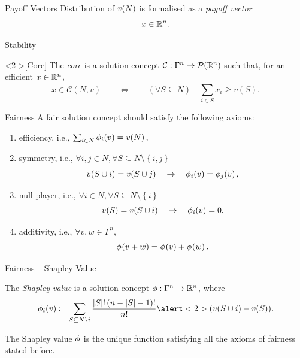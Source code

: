 \documentclass[aspectratio=169]{beamer}
\begin{document}
\begin{frame}{Payoff Vectors}
	Distribution of $ \fce{v}{N} $ is formalised as a \emph{payoff vector}
	\[
		x \in \R^n.
	\]


\end{frame}

\begin{frame}{Stability}
	\begin{definition}<2->[Core]
		The \emph{core} is a solution concept $ \mathcal{C}: \Gamma^n \to \pot {\R^n} $ such that, for an efficient $ x \in \R^n $, \[
			x \in \mathcal{C}(N,v) \qquad \iff \qquad \left( \forall S \subseteq N \right)\quad \sum_{i \in S}^{} x_i \geq v(S).
		\]
	\end{definition}
\end{frame}

\begin{frame}{Fairness}
	A fair solution concept should satisfy the following axioms:
	\begin{enumerate}
		\item<2-> efficiency, i.e., $\sum_{i \in N}^{} \shapley[i]{v} = \fce{v}{N},$
		\item<3-> symmetry, i.e., $  \forall i,j \in N, \forall S \subseteq N \setminus \left\{ i,j \right\} $\[
				 \fce{v}{S \cup i} = \fce{v}{S \cup j} \quad\implies\quad \shapley[i]{v} = \shapley[j]{v} ,
			\]
		\item<4-> null player, i.e., $ \forall i \in N, \forall S \subseteq N \setminus \left\{ i \right\} $
			\[
				\fce{v}{S} = \fce{v}{S \cup i} \quad \implies \quad \shapley[i]{v} = 0,
			\]
		\item<5-> additivity, i.e., $ \forall v,w \in \Gamma^ n, $
			\[
				\shapley{v + w} = \shapley{v} + \shapley{w}.
			\]
	\end{enumerate}
\end{frame}

\begin{frame}{Fairness -- Shapley Value}
	\begin{definition}
		The \emph{Shapley value} is a solution concept $ \Shapley: \Gamma^n \to \R^n $, where \[
			\shapley[i]v \deq \sum_{S \subseteq N \setminus i}^{} \frac{\absolute S! \left( n-\absolute S-1 \right)!}{n!} \alert<2>{\left( \fce{v}{S \cup i} - \fce{v}{S} \right)}.
		\]
	\end{definition}

	\begin{theorem}[Shapley]
		The Shapley value $ \Shapley $ is the \alert<1>{unique} function satisfying all the axioms of fairness stated before.
	\end{theorem}
\end{frame}
\end{document}
